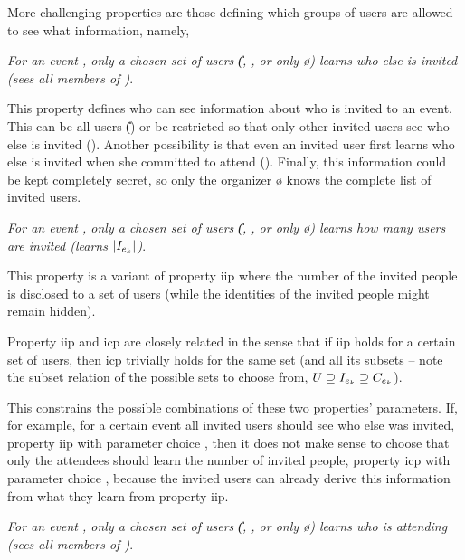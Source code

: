 \noindent More challenging properties are those defining which groups of
users are allowed to see what information, namely, 

{
	\setlength{\parskip}{.5em}
	
	\begin{propertydef}[\Ac{iip}]
		\textit{For an event \e{}, only a chosen 
		set of users (\eg \U{}, \I{}, \C{} or only \o{}) learns
		who else is invited (\ie sees all members of \I{})}.
		\par \noindent
		This property defines who can see information about who is invited to
		an event. 
		This can be all users (\U{}) or be restricted so that only other
		invited users see who else is invited (\I{}). Another
		possibility is that even an invited user first learns who else is
		invited when she committed to attend (\C{}). Finally, this
		information could be kept completely secret, so only the organizer \o{}
	    knows the complete list of invited users.
	\end{propertydef}
	
	\begin{propertydef}[\Ac{icp}]
		\textit{For an event \e{}, only a chosen 
		set of users (\eg \U{}, \I{}, \C{} or only \o{}) learns
		how many users are invited (\ie learns $| \I{} |$)}.
		\par \noindent
		This property is a variant of property \Ac{iip} where the number of
		the invited people \I{} is disclosed to a set of users (while
		the identities of the invited people might remain hidden).
	\end{propertydef}
	Property \Ac{iip} and \Ac{icp} are closely related in the sense that if \Ac{iip}
	holds for a certain set of users, then \Ac{icp} trivially holds for
	the same set (and all its subsets -- note the 
	subset relation of the possible sets to choose from, $\U{} \supseteq \I{} \supseteq \C{}$). 
	
	\noindent This constrains the possible combinations 
	of these two properties' parameters. If, for example, for a certain event all 
	invited users \I{} should see who else was invited, \ie property \Ac{iip} with parameter 
	choice \I{}, then it does not make sense to choose that only the attendees \C{} should 
	learn the number of invited people, \ie property \Ac{icp} with parameter choice 
	\C{}, because the invited users can already derive this information from what 
	they learn from property \Ac{iip}.

	\begin{propertydef}[\Ac{aip}]
		\textit{For an event \e{}, only a chosen
		set of users (\eg \U{}, \I{}, \C{} or only \o{}) learns
		who is attending (\ie sees all members of \C{})}.
	\end{propertydef}

}
